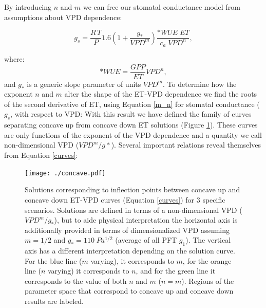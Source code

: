 \documentclass[draft,linenumbers]{agujournal}
\begin{document}
By introducing $n$ and $m$ we can free our stomatal
conductance model from assumptions about VPD dependence:
\begin{linenomath*}
  \begin{equation}
    g_s = \frac{R \, T}{P} 1.6 \left(1 + \frac{g_*}{VPD^m}\right) \frac{*WUE \; ET}{c_a \; VPD^n},
    \label{m_n}
  \end{equation}
\end{linenomath*}
where:
\[*WUE = \frac{GPP}{ET}VPD^n,\] and $g_*$ is a generic slope parameter
of units $VPD^m$. To determine how the exponent $n$ and $m$ alter the
shape of the ET-VPD dependence we find the roots of the second
derivative of ET, using Equation \ref{m_n} for stomatal conductance
($g_s$, with respect to VPD:  With this
result we have defined the family of curves separating concave up from
concave down ET solutions (Figure \ref{concave}). These curves are
only functions of the exponent of the VPD dependence and a quantity we
call non-dimensional VPD ($VPD^m/g*$). Several important
relations reveal themselves from Equation \ref{curves}:

\begin{figure}
  \centering
  \centerline{\texttt{[image: ./concave.pdf]}}
  \caption{ Solutions corresponding to inflection points between
    concave up and concave down ET-VPD curves (Equation \ref{curves})
    for 3 specific scenarios. Solutions are defined in terms of a
    non-dimensional VPD ($VPD^m/g_*$), but to aide physical
    interpretation the horizontal axis is additionally provided in terms of dimensionalized VPD assuming $m=1/2$ and
    $g_*=110\; Pa^{1/2}$ (average of all PFT $g_1$). The vertical axis
    has a different interpretation depending on the solution
    curve. For the blue line ($m$ varying), it corresponds to $m$,
    for the orange line ($n$ varying) it corresponds to $n$, and for
    the green line it corresponds to the value of both $n$ and $m$
    ($n=m$). Regions of the parameter space that correspond to
    concave up and concave down results are labeled.}
  \label{concave}
\end{figure}
\end{document}
